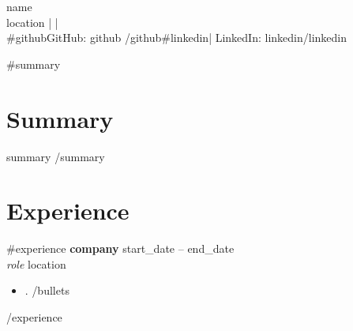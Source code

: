 \documentclass[11pt]{article}
\begin{document}
\begin{center}
{\LARGE {{name}}}\\
{{location}} \quad |  \quad | \\
{{#github}}GitHub: {{github}} {{/github}}{{#linkedin}}\quad | \quad LinkedIn: {{linkedin}}{{/linkedin}}
\end{center}

\vspace{8pt}

{{#summary}}
\section*{Summary}
{{summary}}
\vspace{4pt}
{{/summary}}

\section*{Experience}
{{#experience}}
\textbf{{{company}}} \hfill {{start_date}} -- {{end_date}}\\
\emph{{{role}}} \hfill {{location}}\\
\begin{itemize}
{{#bullets}}
  \item {{{.}}}
{{/bullets}}
\end{itemize}
\vspace{4pt}
{{/experience}}

\end{document}
